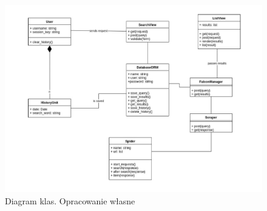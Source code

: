 \begin{figure}[h]
    \includegraphics[width=1.10\textwidth]{zdjecia/klas}
    \caption{Diagram klas. Opracowanie własne}
\end{figure}
